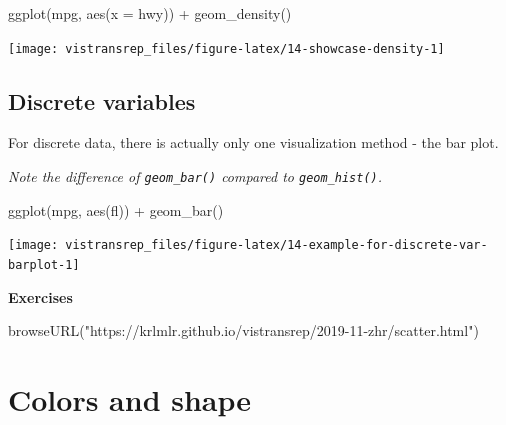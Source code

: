 \documentclass[]{book}
\newenvironment{Shaded}{}{}
\newcommand{\DataTypeTok}[1]{#1}
\newcommand{\KeywordTok}[1]{\textcolor[rgb]{0.00,0.00,1.00}{#1}}
\newcommand{\NormalTok}[1]{#1}
\newcommand{\OperatorTok}[1]{#1}
\newcommand{\StringTok}[1]{\textcolor[rgb]{0.00,0.50,0.50}{#1}}
\begin{document}
\begin{Shaded}
\begin{Highlighting}[]
\KeywordTok{ggplot}\NormalTok{(mpg, }\KeywordTok{aes}\NormalTok{(}\DataTypeTok{x =}\NormalTok{ hwy)) }\OperatorTok{+}
\StringTok{  }\KeywordTok{geom_density}\NormalTok{()}
\end{Highlighting}
\end{Shaded}

\begin{flushright}\texttt{[image: vistransrep\_files/figure-latex/14-showcase-density-1]} \end{flushright}

\hypertarget{discrete-variables}{%
\subsection{Discrete variables}\label{discrete-variables}}

For discrete data, there is actually only one visualization method - the bar plot.

\smallskip

\emph{Note the difference of \texttt{geom\_bar()} compared to \texttt{geom\_hist()}.}

\begin{Shaded}
\begin{Highlighting}[]
\KeywordTok{ggplot}\NormalTok{(mpg, }\KeywordTok{aes}\NormalTok{(fl)) }\OperatorTok{+}
\StringTok{  }\KeywordTok{geom_bar}\NormalTok{()}
\end{Highlighting}
\end{Shaded}

\begin{flushright}\texttt{[image: vistransrep\_files/figure-latex/14-example-for-discrete-var-barplot-1]} \end{flushright}

\textbf{Exercises}

\begin{Shaded}
\begin{Highlighting}[]
\KeywordTok{browseURL}\NormalTok{(}\StringTok{"https://krlmlr.github.io/vistransrep/2019-11-zhr/scatter.html"}\NormalTok{)}
\end{Highlighting}
\end{Shaded}

\hypertarget{colors-and-shape}{%
\section{Colors and shape}\label{colors-and-shape}}
\end{document}

